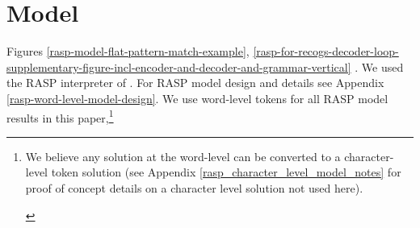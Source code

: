 \documentclass[11pt]{article}
\begin{document}
\section{Model}
\label{model}
Figures \ref{rasp-model-flat-pattern-match-example}, \ref{rasp-for-recogs-decoder-loop-supplementary-figure-incl-encoder-and-decoder-and-grammar-vertical} .
We used the RASP interpreter of \cite{Weiss2021}. For RASP model design and details see Appendix \ref{rasp-word-level-model-design}. We use word-level tokens for all RASP model results in this paper,\footnote{\begin{footnotesize}We believe any solution at the word-level can be converted to a character-level token solution (see Appendix \ref{rasp_character_level_model_notes} for proof of concept details on a character level solution not used here).
\end{footnotesize}
}
\end{document}
